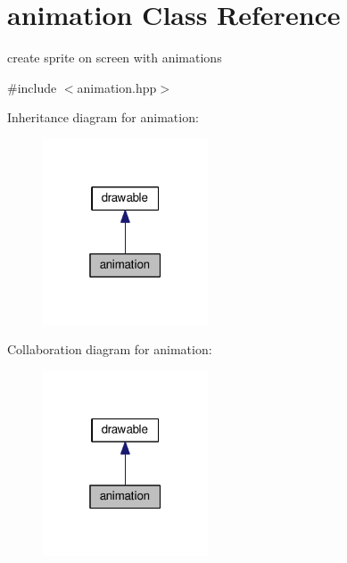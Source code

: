 \hypertarget{classanimation}{}\section{animation Class Reference}
\label{classanimation}


create sprite on screen with animations  




{\ttfamily \#include $<$animation.\+hpp$>$}



Inheritance diagram for animation\+:\nopagebreak
\begin{figure}[H]
\begin{center}
\leavevmode
\includegraphics[width=139pt]{classanimation__inherit__graph}
\end{center}
\end{figure}


Collaboration diagram for animation\+:\nopagebreak
\begin{figure}[H]
\begin{center}
\leavevmode
\includegraphics[width=139pt]{classanimation__coll__graph}
\end{center}
\end{figure}
